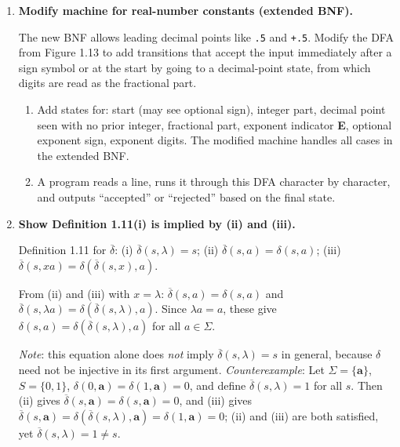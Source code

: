 \documentclass[11pt]{book}
\def\DBAR{\ensuremath{\overline{\delta}}}
\begin{document}
\begin{enumerate}[{1.}1.]
Add states that track the prefixes $\mathbf{D}$, $\mathbf{DO}$, $\mathbf{DA}$, $\mathbf{DAT}$, $\mathbf{DATA}$. When the word ends exactly as $\mathbf{DO}$ or $\mathbf{DATA}$ (with \textless EOS\textgreater), route to a dead (nonfinal) state. All other valid FORTRAN identifiers (alphabetic words not equal to DO or DATA) go to the accepting state.

\item \textbf{Modify machine for real-number constants (extended BNF).}

The new BNF allows leading decimal points like \texttt{.5} and \texttt{+.5}. Modify the DFA from Figure 1.13 to add transitions that accept the input immediately after a sign symbol or at the start by going to a decimal-point state, from which digits are read as the fractional part.

\begin{enumerate}
\item Add states for: start (may see optional sign), integer part, decimal point seen with no prior integer, fractional part, exponent indicator \textbf{E}, optional exponent sign, exponent digits. The modified machine handles all cases in the extended BNF.

\item A program reads a line, runs it through this DFA character by character, and outputs ``accepted'' or ``rejected'' based on the final state.
\end{enumerate}

\item \textbf{Show Definition 1.11(i) is implied by (ii) and (iii).}

Definition 1.11 for $\DBAR$: (i) $\DBAR(s,\lambda)=s$; (ii) $\DBAR(s,a)=\delta(s,a)$; (iii) $\DBAR(s,xa)=\delta(\DBAR(s,x),a)$.

From (ii) and (iii) with $x=\lambda$: $\DBAR(s,a) = \delta(s,a)$ and $\DBAR(s,\lambda a) = \delta(\DBAR(s,\lambda),a)$.
Since $\lambda a = a$, these give $\delta(s,a) = \delta(\DBAR(s,\lambda),a)$ for all $a\in\Sigma$.

\textit{Note}: this equation alone does \emph{not} imply $\DBAR(s,\lambda)=s$ in general, because $\delta$ need not be injective in its first argument.
\textit{Counterexample}: Let $\Sigma=\{\mathbf{a}\}$, $S=\{0,1\}$, $\delta(0,\mathbf{a})=\delta(1,\mathbf{a})=0$, and define $\DBAR(s,\lambda)=1$ for all $s$.
Then (ii) gives $\DBAR(s,\mathbf{a})=\delta(s,\mathbf{a})=0$, and (iii) gives $\DBAR(s,\mathbf{a})=\delta(\DBAR(s,\lambda),\mathbf{a})=\delta(1,\mathbf{a})=0$; (ii) and (iii) are both satisfied, yet $\DBAR(s,\lambda)=1\neq s$.


\end{enumerate}
\end{document}
